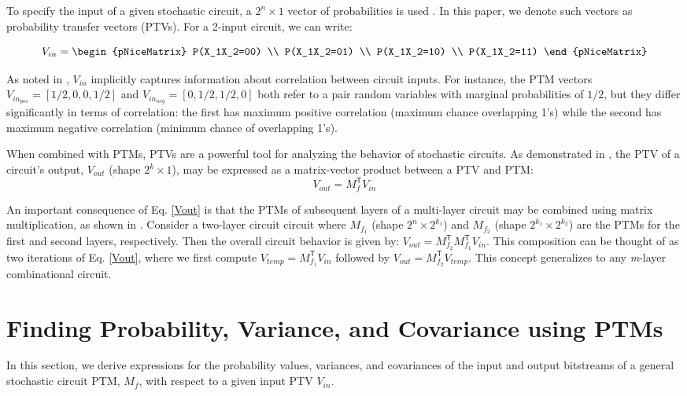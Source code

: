 \documentclass[conference]{IEEEtran}
\begin{document}
To specify the input of a given stochastic circuit, a $2^n \times 1$ vector of probabilities is used \cite{EXPLOITING_CORR}\cite{PTM}. In this paper, we denote such vectors as probability transfer vectors (PTVs). For a 2-input circuit, we can write:

\begin{equation}
V_{in} = \begin{pNiceMatrix}
P(X_1X_2=00) \\
P(X_1X_2=01) \\
P(X_1X_2=10) \\
P(X_1X_2=11)
\end{pNiceMatrix}
\end{equation}

As noted in \cite{PTM}, $V_{in}$ implicitly captures information about correlation between circuit inputs. For instance, the PTM vectors $V_{in_{pos}} = [1/2, 0, 0, 1/2]$ and $V_{in_{neg}} = [0, 1/2, 1/2, 0]$ both refer to a pair random variables with marginal probabilities of $1/2$, but they differ significantly in terms of correlation: the first has maximum positive correlation (maximum chance overlapping 1's) while the second has maximum negative correlation (minimum chance of overlapping 1's).

When combined with PTMs, PTVs are a powerful tool for analyzing the behavior of stochastic circuits. As demonstrated in \cite{EXPLOITING_CORR}, the PTV of a circuit's output, $V_{out}$ (shape $2^k \times 1$), may be expressed as a matrix-vector product between a PTV and PTM:
\begin{equation}\label{Vout}
V_{out} = M_{f}^{\textsf{T}}V_{in}
\end{equation}

An important consequence of Eq. \ref{Vout} is that the PTMs of subsequent layers of a multi-layer circuit may be combined using matrix multiplication, as shown in \cite{PTM}. Consider a two-layer circuit circuit where $M_{f_1}$ (shape $2^n \times 2^{k_1}$) and $M_{f_2}$ (shape $2^{k_1} \times 2^{k_2}$) are the PTMs for the first and second layers, respectively. Then the overall circuit behavior is given by: $V_{out} = M_{f_2}^{\mathsf{T}}M_{f_1}^{\mathsf{T}}V_{in}$. This composition can be thought of as two iterations of Eq. \ref{Vout}, where we first compute $V_{temp} = M_{f_1}^{\mathsf{T}}V_{in}$ followed by $V_{out} = M_{f_2}^{\mathsf{T}}V_{temp}$. This concept generalizes to any \textit{m}-layer combinational circuit.

\section{Finding Probability, Variance, and Covariance using PTMs}
In this section, we derive expressions for the probability values, variances, and covariances of the input and output bitstreams of a general stochastic circuit PTM, $M_f$, with respect to a given input PTV $V_{in}$.
\end{document}
